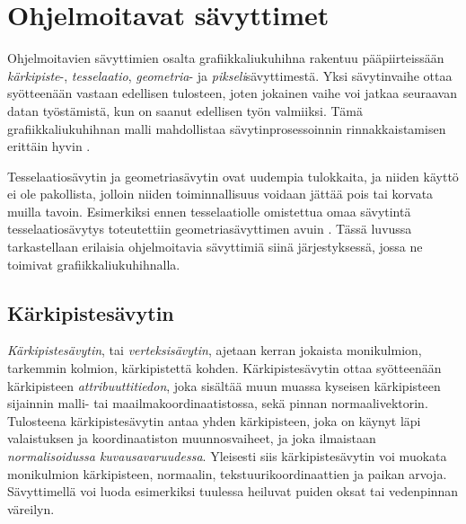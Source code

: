 \documentclass[finnish]{tktltiki2}
\theoremstyle{definition}
\theoremstyle{remark}
\begin{document}
\section{Ohjelmoitavat sävyttimet}

Ohjelmoitavien sävyttimien osalta grafiikkaliukuhihna rakentuu pääpiirteissään \emph{kärkipiste}-, \emph{tesselaatio}, \emph{geometria}- ja \emph{pikseli}sävyttimestä. Yksi sävytinvaihe ottaa syötteenään vastaan edellisen tulosteen, joten jokainen vaihe voi jatkaa seuraavan datan työstämistä, kun on saanut edellisen työn valmiiksi. Tämä grafiikkaliukuhihnan malli mahdollistaa sävytinprosessoinnin rinnakkaistamisen erittäin hyvin \cite{Ake02}. 

Tesselaatiosävytin ja geometriasävytin ovat uudempia tulokkaita, ja niiden käyttö ei ole pakollista, jolloin niiden toiminnallisuus voidaan jättää pois tai korvata muilla tavoin. Esimerkiksi ennen tesselaatiolle omistettua omaa sävytintä tesselaatiosävytys toteutettiin geometriasävyttimen avuin \cite{Sch14}. Tässä luvussa tarkastellaan erilaisia ohjelmoitavia sävyttimiä siinä järjestyksessä, jossa ne toimivat grafiikkaliukuhihnalla.

\subsection{Kärkipistesävytin}

\emph{Kärkipistesävytin}, tai \emph{verteksisävytin}, ajetaan kerran jokaista monikulmion, tarkemmin kolmion, kärkipistettä kohden. Kärkipistesävytin ottaa syötteenään kärkipisteen \emph{attribuuttitiedon}, joka sisältää muun muassa kyseisen kärkipisteen sijainnin malli- tai maailmakoordinaatistossa, sekä pinnan normaalivektorin. Tulosteena kärkipistesävytin antaa yhden kärkipisteen, joka on käynyt läpi valaistuksen ja koordinaatiston muunnosvaiheet, ja joka ilmaistaan \emph{normalisoidussa kuvausavaruudessa}. Yleisesti siis kärkipistesävytin voi muokata monikulmion kärkipisteen, normaalin, tekstuurikoordinaattien ja paikan arvoja. Sävyttimellä voi luoda esimerkiksi tuulessa heiluvat puiden oksat tai vedenpinnan väreilyn.
\end{document}
